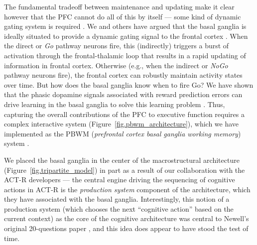 \documentclass[11pt,twoside]{article}
\begin{document}
The fundamental tradeoff between maintenance and updating make it clear
however that the PFC cannot do all of this by itself --- some kind of dynamic
gating system is required \cite{OReillyBraverCohen99}.  We and others have
argued that the basal ganglia is ideally situated to provide a dynamic gating
signal to the frontal cortex \cite[e.g., ]{FrankLoughryOReilly01}.  When the
direct or {\em Go} pathway neurons fire, this (indirectly) triggers a burst of
activation through the frontal-thalamic loop that results in a rapid updating
of information in frontal cortex.  Otherwise (e.g., when the indirect or {\em
  NoGo} pathway neurons fire), the frontal cortex can robustly maintain
activity states over time.  But how does the basal ganglia know when to fire
Go?  We have shown that the phasic dopamine signals associated with reward
prediction errors can drive learning in the basal ganglia to solve this
learning problem \cite{OReillyFrank06}.  Thus, capturing the overall
contributions of the PFC to executive function requires a complex interactive
system (Figure~\ref{fig.pbwm_architecture}), which we have implemented as the
PBWM ({\em prefrontal cortex basal ganglia working memory}) system
\cite{OReillyFrank06,HazyFrankOReilly06,HazyFrankOReilly07,
  HazyPauliHerdEtAlInPrep}.

We placed the basal ganglia in the center of the macrostructural architecture
(Figure~\ref{fig.tripartite_model}) in part as a result of our collaboration
with the ACT-R developers --- the central engine driving the sequencing of
cognitive actions in ACT-R is the {\em production system} component of the
architecture, which they have associated with the basal ganglia.
Interestingly, this notion of a production system (which chooses the next ``cognitive action'' based on the current context) as the core of the
cognitive architecture was central to Newell's original 20-questions paper
\cite{Newell73}, and this idea does appear to have stood the test of time.
 
\end{document}
